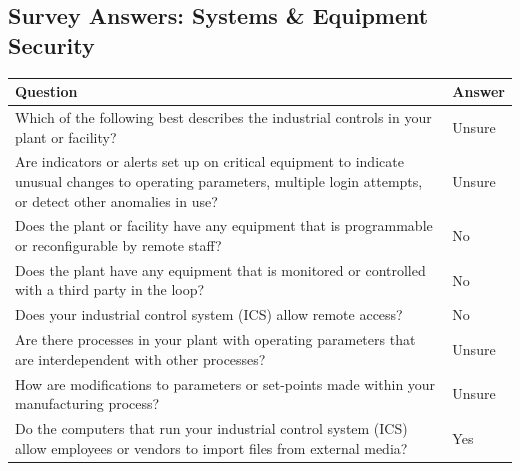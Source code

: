 \newpage

\subsection*{Survey Answers: Systems \& Equipment Security}
\begin{table}[h]
\begin{tabularx}{\textwidth}{>{\raggedright\arraybackslash}X >{\raggedright\arraybackslash}X}
\toprule
\textbf{Question} & \textbf{Answer} \\
\midrule
Which of the following best describes the industrial controls in your plant or facility?& Unsure \\
\addlinespace

Are indicators or alerts set up on critical equipment to indicate unusual changes to operating parameters, multiple login attempts, or detect other anomalies in use? & Unsure \\
\addlinespace
Does the plant or facility have any equipment that is programmable or reconfigurable by remote staff?& No\\
\addlinespace
Does the plant have any equipment that is monitored or controlled with a third party in the loop?& No\\
\addlinespace
Does your industrial control system (ICS) allow remote access? & No \\
\addlinespace
Are there processes in your plant with operating parameters that are interdependent with other processes?& Unsure\\
\addlinespace
How are modifications to parameters or set-points made within your manufacturing process?& Unsure\\
\addlinespace
Do the computers that run your industrial control system (ICS) allow employees or vendors to import files from external media?& Yes\\

\bottomrule
\end{tabularx}
\end{table}
